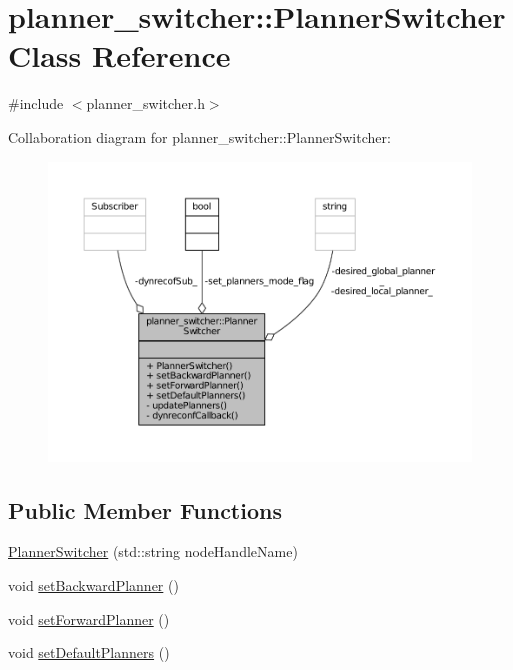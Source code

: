 \hypertarget{classplanner__switcher_1_1PlannerSwitcher}{}\section{planner\+\_\+switcher\+:\+:Planner\+Switcher Class Reference}
\label{classplanner__switcher_1_1PlannerSwitcher}


{\ttfamily \#include $<$planner\+\_\+switcher.\+h$>$}



Collaboration diagram for planner\+\_\+switcher\+:\+:Planner\+Switcher\+:
\nopagebreak
\begin{figure}[H]
\begin{center}
\leavevmode
\includegraphics[width=350pt]{classplanner__switcher_1_1PlannerSwitcher__coll__graph}
\end{center}
\end{figure}
\subsection*{Public Member Functions}
\begin{DoxyCompactItemize}
\item 
\hyperlink{classplanner__switcher_1_1PlannerSwitcher_a58650f505c93e02aeaaa0464a178dcba}{Planner\+Switcher} (std\+::string node\+Handle\+Name)
\item 
void \hyperlink{classplanner__switcher_1_1PlannerSwitcher_a61d1ffa3ba0dcbde83c55167beb3da60}{set\+Backward\+Planner} ()
\item 
void \hyperlink{classplanner__switcher_1_1PlannerSwitcher_ad21a65cd3c3bfd8e094976f135ecef38}{set\+Forward\+Planner} ()
\item 
void \hyperlink{classplanner__switcher_1_1PlannerSwitcher_ab6860472ebc5f090b0f36ff91a91fc36}{set\+Default\+Planners} ()
\end{DoxyCompactItemize}
